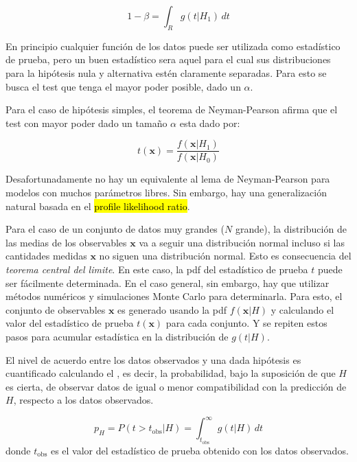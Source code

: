 \begin{equation}
1-\beta = \int_R g(t|H_1)\, dt
\end{equation}

En principio cualquier función de los datos puede ser utilizada como estadístico
de prueba, pero un buen estadístico sera aquel para el cual sus distribuciones para
la hipótesis nula y alternativa estén claramente separadas. Para esto
se busca el test que tenga el mayor poder posible, dado un $\alpha$.

Para el caso de hipótesis simples, el teorema de Neyman-Pearson afirma
que el test con mayor poder dado un tama\~no $\alpha$ esta dado por:


\begin{equation}
  t(\bm{x}) = \frac{f(\bm{x}|H_1)}{f(\bm{x}|H_0)}
\end{equation}

Desafortunadamente no hay un equivalente al lema de Neyman-Pearson para modelos
con muchos parámetros libres. Sin embargo, hay una generalización natural basada
en el \hl{profile likelihood ratio}.

Para el caso de un conjunto de datos muy grandes ($N$ grande), la distribución
de las medias de los observables $\bm{x}$ va a seguir una distribución normal
incluso si las cantidades medidas $\bm{x}$ no siguen una distribución normal.
Esto es consecuencia del \emph{teorema central del limite}. En este caso, la pdf
del estadístico de prueba $t$ puede ser fácilmente determinada. En el caso
general, sin embargo, hay que utilizar métodos numéricos y simulaciones Monte
Carlo para determinarla. Para esto, el conjunto de observables $\bm{x}$ es
generado usando la pdf $f(\bm{x}|H)$ y calculando el valor del estadístico de
prueba $t(\bm{x})$ para cada conjunto. Y se repiten estos pasos para acumular
estadística en la distribución de $g(t|H)$.

El nivel de acuerdo entre los datos observados y una dada hipótesis es
cuantificado calculando el \emph{\pvalue}, es decir, la probabilidad, bajo la
suposición de que $H$ es cierta, de observar datos de igual o menor
compatibilidad con la predicción de $H$, respecto a los datos observados.

\begin{equation}
  p_H = P(t>t_\text{obs}|H) = \int_{t_\text{obs}}^{\infty} g(t|H) \, dt
\end{equation}
%
donde $t_\text{obs}$ es el valor del estadístico de prueba obtenido con los
datos observados.

